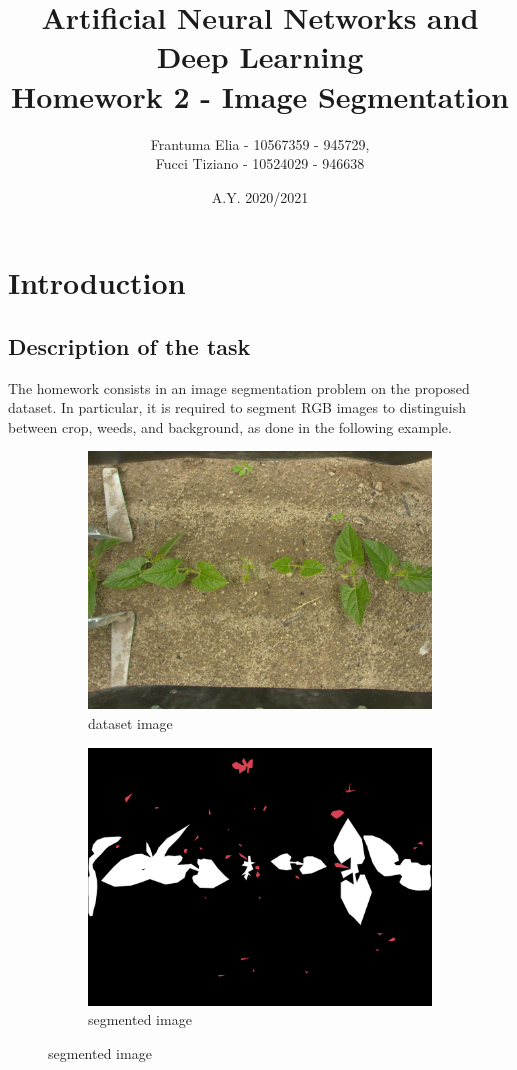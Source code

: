 \documentclass[12pt,a4paper]{report}
\title{Artificial Neural Networks and Deep Learning \\ Homework 2 - Image Segmentation}
\author{Frantuma Elia - 10567359 - 945729, \\
		Fucci Tiziano - 10524029 - 946638}
\date{A.Y. 2020/2021}
\begin{document}
	\maketitle
	\tableofcontents
	\chapter{Introduction}
		\section{Description of the task}
			The homework consists in an image segmentation problem on the proposed dataset. In particular, it is required to segment RGB images to distinguish between crop, weeds, and background, as done in the following example.

\begin{figure}[H]
\renewcommand*\thesubfigure{\arabic{subfigure}} 
\centering
\begin{subfigure}{.45\textwidth}
  \centering
  \includegraphics[width=1\linewidth]{image0}
  \caption{dataset image}
  \label{fig:sub1}
\end{subfigure}
\begin{subfigure}{.45\textwidth}
  \centering
  \includegraphics[width=1\linewidth]{image1}
  \caption{segmented image}
  \label{fig:sub2}
\end{subfigure}
\end{figure}
\end{document}
